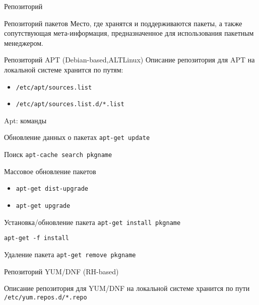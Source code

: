 
\begin{frame}{Репозиторий}
	\begin{block}{Репозиторий пакетов}
		Место, где хранятся и поддерживаются пакеты, а также сопутствующая мета-информация, предназначенное для использования пакетным менеджером.
	\end{block}
\end{frame}

\begin{frame}{Репозиторий APT (Debian-based,ALTLinux)}
		Описание репозитория для APT на локальной системе хранится по путям:
		\begin{itemize}
		    \item {\tt /etc/apt/sources.list}
		    \item {\tt /etc/apt/sources.list.d/*.list}
		\end{itemize}
\end{frame}

\begin{frame}{Apt: команды}
	\begin{block}{Обновление данных о пакетах}
		{\tt apt-get update }
	\end{block}
	\begin{block}{Поиск}
		{\tt apt-cache search pkgname }
	\end{block}
	\begin{block}{Массовое обновление пакетов}
		\begin{itemize}
		    \item {\tt apt-get dist-upgrade}
		    \item {\tt apt-get upgrade}
		\end{itemize}
	\end{block}
	\begin{block}{Установка/обновление пакета}
		{\tt apt-get install pkgname }

                {\tt apt-get -f install}
	\end{block}
	\begin{block}{Удаление пакета}
		{\tt apt-get remove pkgname }
	\end{block}
\end{frame}

\begin{frame}{Репозиторий YUM/DNF (RH-based)}

		Описание репозитория для YUM/DNF на локальной системе хранится по пути\\
		{\tt /etc/yum.repos.d/*.repo}
\end{frame}

